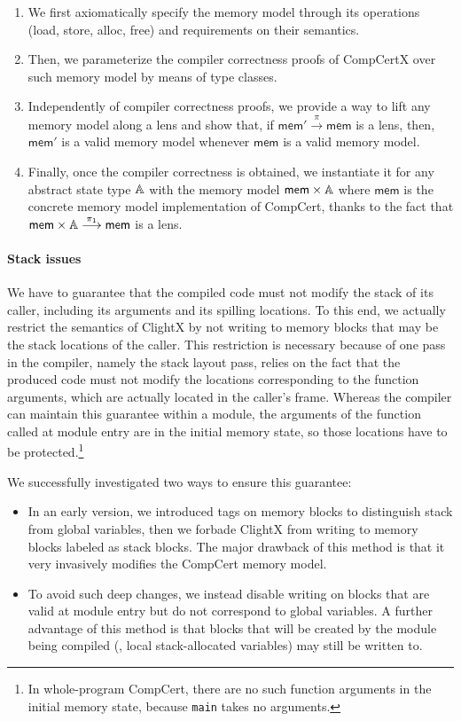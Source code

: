 \begin{enumerate}
\item We first axiomatically specify the memory model through its
  operations (load, store, alloc, free) and requirements on their
  semantics.
\item Then, we parameterize the compiler correctness proofs of
  CompCertX over such memory model by means of type classes.
\item Independently of compiler correctness proofs, we provide a
  way to lift any memory model along a lens and show that, if 
  $\textsf{mem}'
  \stackrel{\pi}{\longrightarrow} \textsf{mem}$ is a lens, then, $\textsf{mem}'$ is a valid
  memory model whenever $\textsf{mem}$ is a valid memory model.
\item Finally, once the compiler correctness is obtained, we
  instantiate it for any abstract state type $\mathbb{A}$ with the memory model $\textsf{mem} \times \mathbb{A}$
  where $\textsf{mem}$ is the concrete memory model implementation of CompCert,
  thanks to the fact that $\textsf{mem} \times \mathbb{A}
  \stackrel{\pi_1}{\longrightarrow} \textsf{mem}$ is a lens.
\end{enumerate}


\paragraph{Stack issues} 
We have to guarantee that the compiled code must not modify the stack
of its caller, including its arguments and its spilling locations. To
this end, we actually restrict the semantics of ClightX by not writing
to memory blocks that may be the stack locations of the caller.  This
restriction is necessary because of one pass in the compiler, namely the
stack layout pass, relies on the fact that the produced code must not
modify the locations corresponding to the function arguments, which
are actually located in the caller's frame. Whereas the compiler
can maintain this guarantee within a module, the arguments of the
function called at module entry are in the initial memory state, so
those locations have to be protected.\footnote{In whole-program
  CompCert, there are no such function arguments in the initial memory
  state, because \texttt{main} takes no arguments.}

We successfully investigated two ways to ensure this guarantee:
\begin{itemize}
\item In an early version, we introduced tags on memory blocks to
  distinguish stack from global variables, then we forbade ClightX
  from writing to memory blocks labeled as stack blocks. The major
  drawback of this method is that it very invasively modifies the
  CompCert memory model.
\item To avoid such deep changes, we instead disable writing on blocks
  that are valid at module entry but do not correspond to global
  variables. A further advantage of this method is that blocks that will be
  created by the module being compiled (\eg, local stack-allocated
  variables) may still be written to.
\end{itemize}


